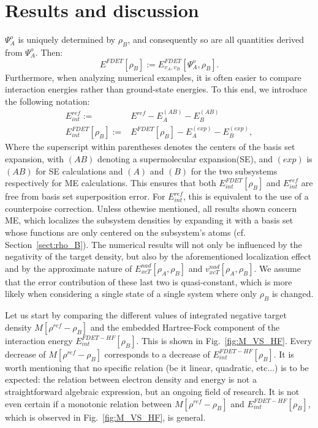 \documentclass[journal=jctcce,manuscript=article, layout=twocolumn]{achemso}
\begin{document}
\section{Results and discussion}
$\Psi^{o}_A$ is uniquely determined by $\rho_B$, and consequently so are all quantities derived from $\Psi^{o}_A$. Then:
\begin{equation}
 E^{FDET}[\rho_B] := E_{v_A,v_B}^{FDET}[\Psi^{o}_{A},\rho_B].
\end{equation}
Furthermore, when analyzing numerical examples, it is often easier to compare interaction energies rather than ground-state energies. To this end, we introduce the following notation:
\begin{align}
 E^{ref}_{int} := & E^{ref} - E^{(AB)}_A - E^{(AB)}_B \\ \nonumber
 E^{FDET}_{int}[\rho_B] := & E^{FDET}[\rho_B] - E^{(exp)}_A - E^{(exp)}_B,
\end{align}
Where the superscript within parentheses denotes the centers of the basis set expansion, with $(AB)$ denoting a supermolecular expansion(SE), and $(exp)$ is $(AB)$ for SE calculations and $(A)$ and $(B)$ for the two subsystems respectively for ME calculations. This ensures that both $E^{FDET}_{int}[\rho_B]$ and  $E^{ref}_{int}$ are free from basis set superposition error. For $E^{ref}_{int}$, this is equivalent to the use of a counterpoise correction\cite{Boys1970}.
Unless othewise mentioned, all results shown concern ME, which localizes the subsystem densities by expanding it with a basis set whose functions are only centered on the subsystem's atoms (cf. Section~\ref{sect:rho_B}).
The numerical results will not only be influenced by the negativity of the target density, but also by the aforementioned localization effect and by the approximate nature of $E_{xcT}^{nad}[\rho_A, \rho_B]$ and $v_{xcT}^{nad}[\rho_A, \rho_B]$. We assume that the error contribution of these last two is quasi-constant, which is more likely when considering a single state of a single system where only $\rho_B$ is changed.

Let us start by comparing the different values of integrated negative target density $M[\rho^{ref} - \rho_B]$ and the embedded Hartree-Fock component of the interaction energy $E^{FDET-HF}_{int}[\rho_B]$. This is shown in Fig.~\ref{fig:M_VS_HF}.
Every decrease of $M[\rho^{ref} - \rho_B]$ corresponds to a decrease of $E^{FDET-HF}_{int}[\rho_B]$. It is worth mentioning that no specific relation (be it linear, quadratic, etc...) is to be expected: the relation between electron density and energy is not a straightforward algebraic expression, but an ongoing field of research. It is not even certain if a monotonic relation between $M[\rho^{ref} - \rho_B]$ and $E^{FDET-HF}_{int}[\rho_B]$, which is observed in Fig.~\ref{fig:M_VS_HF}, is general.
\end{document}
